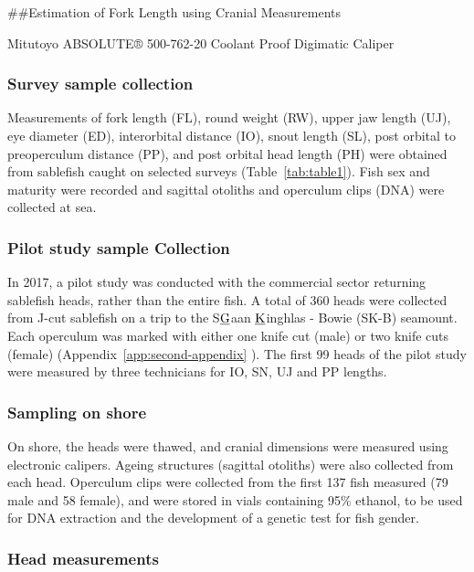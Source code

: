 \documentclass[12pt]{article}\usepackage[]{graphicx}\usepackage[]{color}
\begin{document}
\#\#Estimation of Fork Length using Cranial Measurements

Mitutoyo ABSOLUTE® 500-762-20 Coolant Proof Digimatic Caliper

\hypertarget{survey-sample-collection}{%
\subsubsection{Survey sample collection}\label{survey-sample-collection}}

Measurements of fork length (FL), round weight (RW), upper jaw length (UJ), eye diameter (ED), interorbital distance (IO), snout length (SL), post orbital to preoperculum distance (PP), and post orbital head length (PH) were obtained from sablefish caught on selected surveys (Table~\ref{tab:table1}). Fish sex and maturity were recorded and sagittal otoliths and operculum clips (DNA) were collected at sea.

\hypertarget{pilot-study-sample-collection}{%
\subsubsection{Pilot study sample Collection}\label{pilot-study-sample-collection}}

In 2017, a pilot study was conducted with the commercial sector returning sablefish heads, rather than the entire fish. A total of 360 heads were collected from J-cut sablefish on a trip to the S\(\text{\underline{G}}\)aan \(\text{\underline{K}}\)inghlas - Bowie (SK-B) seamount. Each operculum was marked with either one knife cut (male) or two knife cuts (female) (Appendix~\ref{app:second-appendix} ). The first 99 heads of the pilot study were measured by three technicians for IO, SN, UJ and PP lengths.

\hypertarget{sampling-on-shore}{%
\subsubsection{Sampling on shore}\label{sampling-on-shore}}

On shore, the heads were thawed, and cranial dimensions were measured using electronic calipers. Ageing structures (sagittal otoliths) were also collected from each head. Operculum clips were collected from the first 137 fish measured (79 male and 58 female), and were stored in vials containing 95\% ethanol, to be used for DNA extraction and the development of a genetic test for fish gender.

\hypertarget{head-measurements}{%
\subsubsection{Head measurements}\label{head-measurements}}
\end{document}
